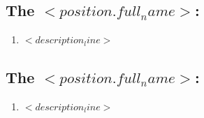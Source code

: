 \documentclass{header-footer}
\begin{document}
\hypertarget{$<{ position.id }>$}{}
\subsection*{The $<{ position.full_name }>$:}
\begin{enumerate}
    \item $<{ description_line }>$
\end{enumerate}

\hypertarget{$<{ position.id }>$}{}
\subsection*{The $<{ position.full_name }>$:}
\begin{enumerate}
    \item $<{ description_line }>$
\end{enumerate}
\end{document}
